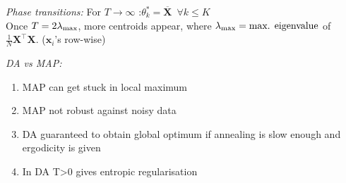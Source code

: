 \emph{Phase transitions:}\enspace
For $T {\to} \infty$ :\enspace $\theta_k^\ast = \overline{\bm X} \enspace \forall k\leq K$\\
Once $T=2\lambda_\mathrm{max}$, more centroids appear, where $\lambda_\mathrm{max} = \textrm{max. eigenvalue}$ of $\frac1N \bm X^\top \bm X$.
\enspace($\bm x_i$'s row-wise)

\emph{DA vs MAP:}\enspace
\begin{enumerate}
    \item MAP can get stuck in local maximum
    \item MAP not robust against noisy data
    \item DA guaranteed to obtain global optimum if annealing is slow enough and ergodicity is given
    \item In DA T>0 gives entropic regularisation
\end{enumerate}